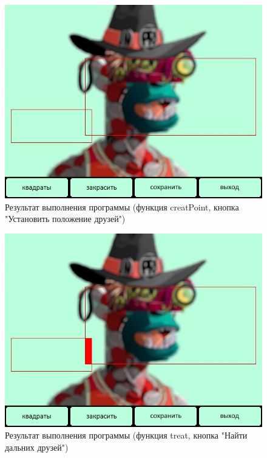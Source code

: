 \documentclass[14pt, a4paper]{extreport}
\begin{document}
\begin{figure}[h!]
	\centering
	\includegraphics[width = 12cm]{image/output1}
  \caption{Результат выполнения программы (функция creatPoint, кнопка "Установить положение друзей")}
\end{figure}

\begin{figure}[h!]
	\centering
	\includegraphics[width = 12cm]{image/output2}
  \caption{Результат выполнения программы (функция treat, кнопка "Найти дальних друзей")}
\end{figure}

\end{document}
